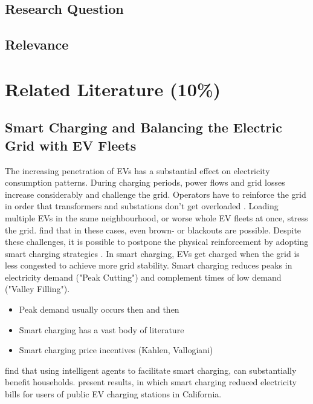 \documentclass[12pt, article]{article}
\begin{document}
\subsection{Research Question}
\label{sec:org4608ff2}
\subsection{Relevance}
\label{sec:org422c191}

\section{Related Literature (10\%)}
\label{sec:org0eab3d5}
\subsection{Smart Charging and Balancing the Electric Grid with EV Fleets}
\label{sec:org1917fbe}
The increasing penetration of EVs has a substantial effect on electricity consumption
patterns. During charging periods, power flows and grid losses increase
considerably and challenge the grid. Operators have to reinforce the grid in
order that transformers and substations don't get overloaded
\parencite{lopes11_integ_elect_vehic_elect_power_system}. Loading multiple EVs in the
same neighbourhood, or worse whole EV fleets at once, stress the grid.
\textcite{kim12_carbit} find that in these cases, even brown- or blackouts are
possible. Despite these challenges, it is possible to postpone the physical
reinforcement by adopting smart charging strategies \parencite{kim12_carbit}. In
smart charging, EVs get charged when the grid is less congested to achieve more
grid stability. Smart charging reduces peaks in electricity demand ("Peak Cutting") and
complement times of low demand ("Valley Filling").

\begin{itemize}
\item Peak demand usually occurs then and then
\item Smart charging has a vast body of literature
\item Smart charging price incentives (Kahlen, Vallogiani)
\end{itemize}

\textcite{valogianni14_effec_manag_elect_vehic_storag} find that using intelligent
agents to facilitate smart charging, can substantially benefit households.
\textcite{kara15_estim_benef_elect_vehic_smart} present results, in which smart
charging reduced electricity bills for users of public EV charging stations in
California.
\end{document}
